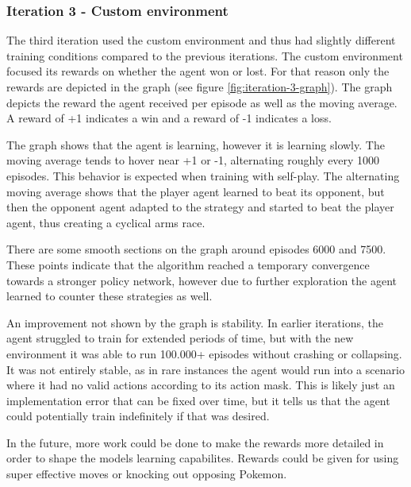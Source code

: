 \subsubsection{Iteration 3 - Custom environment}
The third iteration used the custom environment and thus had slightly different training conditions compared to the previous iterations.
The custom environment focused its rewards on whether the agent won or lost. For that reason only the rewards are depicted in the graph (see figure \ref{fig:iteration-3-graph}).
The graph depicts the reward the agent received per episode as well as the moving average. A reward of +1 indicates a win and a reward of -1 indicates a loss.

The graph shows that the agent is learning, however it is learning slowly. The moving average tends to hover near +1 or -1, alternating roughly every 1000 episodes.
This behavior is expected when training with self-play. The alternating moving average shows that the player agent learned to beat its opponent, but then the opponent 
agent adapted to the strategy and started to beat the player agent, thus creating a cyclical arms race. 

There are some smooth sections on the graph around episodes 6000 and 7500. These points indicate that the algorithm reached a temporary convergence towards
a stronger policy network, however due to further exploration the agent learned to counter these strategies as well.

An improvement not shown by the graph is stability. In earlier iterations, the agent struggled to train for extended periods of time, but with the new environment
it was able to run 100.000+ episodes without crashing or collapsing. It was not entirely stable, as in rare instances the agent would run into a scenario where it
had no valid actions according to its action mask. This is likely just an implementation error that can be fixed over time, but it tells us that the agent could
potentially train indefinitely if that was desired. 

In the future, more work could be done to make the rewards more detailed in order to shape the models learning capabilites. Rewards could be given for using
super effective moves or knocking out opposing Pokemon.

